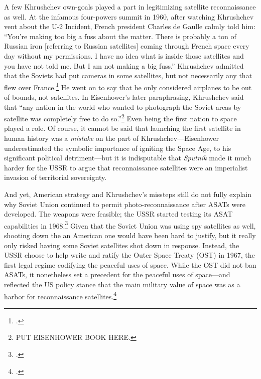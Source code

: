 \documentclass{memoir}
\begin{document}
A few Khrushchev own-goals played a part in legitimizing satellite reconnaissance as well. At the infamous four-powers summit in 1960, after watching Khrushchev vent about the U-2 Incident, French president Charles de Gaulle calmly told him: ``You're making too big a fuss about the matter. There is probably a ton of Russian iron [referring to Russian satellites] coming through French space every day without my permissions. I have no idea what is inside those satellites and you have not told me. But I am not making a big fuss.'' Khrushchev admitted that the Soviets had put cameras in some satellites, but not necessarily any that flew over France.\footcite[p.~353]{brugioni_eyes_2010} He went on to say that he only considered airplanes to be out of bounds, not satellites. In Eisenhower's later paraphrasing, Khrushchev said that ``any nation in the world who wanted to photograph the Soviet areas by satellite was completely free to do so.''\footnote{PUT EISENHOWER BOOK HERE.} Even being the first nation to space played a role. Of course, it cannot be said that launching the first satellite in human history was a \emph{mistake} on the part of Khrushchev---Eisenhower underestimated the symbolic importance of igniting the Space Age, to his significant political detriment---but it is indisputable that \emph{Sputnik} made it much harder for the USSR to argue that reconnaissance satellites were an imperialist invasion of territorial sovereignty.

And yet, American strategy and Khrushchev's missteps still do not fully explain why Soviet Union continued to permit photo-reconnaissance after ASATs were developed. The weapons were feasible; the USSR started testing its ASAT capabilities in 1968.\footcite[p.~149]{karas_new_1983} Given that the Soviet Union was using spy satellites as well, shooting down the an American one would have been hard to justify, but it really only risked having some Soviet satellites shot down in response. Instead, the USSR choose to help write and ratify the Outer Space Treaty (OST) in 1967, the first legal regime codifying the peaceful uses of space. While the OST did not ban ASATs, it nonetheless set a precedent for the peaceful uses of space---and reflected the US policy stance that the main military value of space was as a harbor for reconnaissance satellites.\footcite[p~16]{mowthorpe_militarization_2004}
\end{document}
